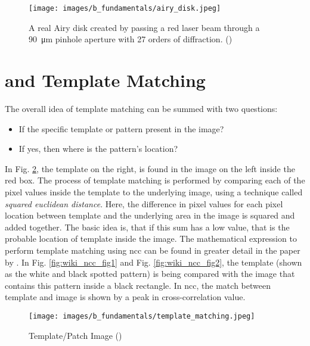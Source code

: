     \begin{figure}[h]
        \centering
        \texttt{[image: images/b\_fundamentals/airy\_disk.jpeg]}
        \caption{A real Airy disk created by passing a red laser beam through a \SI{90}{\micro\meter} pinhole aperture with 27 orders of diffraction. (\cite{img_airy_disk})}
        \label{fig:airy_disk}
    \end{figure}


    \section*{ and Template Matching}\label{section:ncc}

    The overall idea of template matching can be summed with two questions:
    
    \begin{itemize}
        \item If the specific template or pattern present in the image?
        \item If yes, then where is the pattern's location?
    \end{itemize}

    \vspace{5mm}
    \noindent In Fig. \ref{fig:template_matching}, the template on the right, is found in the image on the left inside the red box. The process of template matching is performed by comparing each of the pixel values inside the template to the underlying image, using a technique called \emph{squared euclidean distance}. Here, the difference in pixel values for each pixel location between template and the underlying area in the image is squared and added together. The basic idea is, that if this sum has a low value, that is the probable location of template inside the image. The mathematical expression to perform template matching using \gls{ncc} can be found in greater detail in the paper by \cite{lewis}. In Fig. \ref{fig:wiki_ncc_fig1} and Fig. \ref{fig:wiki_ncc_fig2}, the template (shown as the white and black spotted pattern) is being compared with the image that contains this pattern inside a black rectangle. In \gls{ncc}, the match between template and image is shown by a peak in cross-correlation value.

    \begin{figure}[h]
        \centering
        \texttt{[image: images/b\_fundamentals/template\_matching.jpeg]}
        \caption{Template/Patch Image (\cite{ralph_caubalejo})}
        \label{fig:template_matching}
    \end{figure}
    
